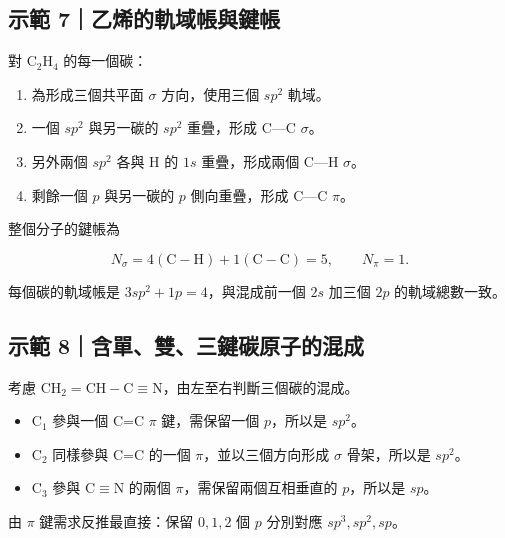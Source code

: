 \documentclass[11pt,a4paper]{article}
\providecommand{\tightlist}{%
  \setlength{\itemsep}{0pt}\setlength{\parskip}{0pt}}
\begin{document}
\begin{HandoutWorkedExample}

\subsection{示範 7｜乙烯的軌域帳與鍵帳}\label{ux793aux7bc4-7ux4e59ux70efux7684ux8eccux57dfux5e33ux8207ux9375ux5e33}

對 \(\mathrm{C_2H_4}\) 的每一個碳：

\begin{enumerate}
\def\labelenumi{\arabic{enumi}.}
\tightlist
\item
  為形成三個共平面 \(\sigma\) 方向，使用三個 \(sp^2\) 軌域。
\item
  一個 \(sp^2\) 與另一碳的 \(sp^2\) 重疊，形成 C---C \(\sigma\)。
\item
  另外兩個 \(sp^2\) 各與 H 的 \(1s\) 重疊，形成兩個 C---H \(\sigma\)。
\item
  剩餘一個 \(p\) 與另一碳的 \(p\) 側向重疊，形成 C---C \(\pi\)。
\end{enumerate}

整個分子的鍵帳為

\[
N_\sigma=4(\mathrm{C-H})+1(\mathrm{C-C})=5,
\qquad N_\pi=1.
\]

每個碳的軌域帳是 \(3sp^2+1p=4\)，與混成前一個 \(2s\) 加三個 \(2p\) 的軌域總數一致。

\end{HandoutWorkedExample}

\begin{HandoutWorkedExample}

\subsection{示範 8｜含單、雙、三鍵碳原子的混成}\label{ux793aux7bc4-8ux542bux55aeux96d9ux4e09ux9375ux78b3ux539fux5b50ux7684ux6df7ux6210}

考慮 \(\mathrm{CH_2=CH-C\equiv N}\)，由左至右判斷三個碳的混成。

\begin{itemize}
\tightlist
\item
  C\(_1\) 參與一個 C=C \(\pi\) 鍵，需保留一個 \(p\)，所以是 \(sp^2\)。
\item
  C\(_2\) 同樣參與 C=C 的一個 \(\pi\)，並以三個方向形成 \(\sigma\) 骨架，所以是 \(sp^2\)。
\item
  C\(_3\) 參與 C\(\equiv\)N 的兩個 \(\pi\)，需保留兩個互相垂直的 \(p\)，所以是 \(sp\)。
\end{itemize}

由 \(\pi\) 鍵需求反推最直接：保留 \(0,1,2\) 個 \(p\) 分別對應 \(sp^3,sp^2,sp\)。

\end{HandoutWorkedExample}
\end{document}
